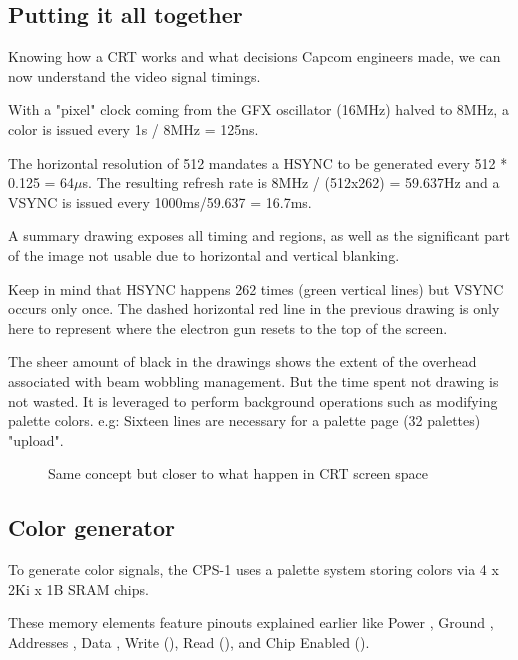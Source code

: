 \subsection{Putting it all together}

Knowing how a CRT works and what decisions Capcom engineers made, we can now understand the video signal timings.

With a "pixel" clock coming from the GFX oscillator (16MHz) halved to 8MHz, a color is issued every 1s / 8MHz = 125ns.

The horizontal resolution of 512 mandates a HSYNC to be generated every 512 * 0.125 = 64$\mu$s. The resulting refresh rate is 8MHz / (512x262) = 59.637Hz and a VSYNC is issued every 1000ms/59.637 = 16.7ms.


A summary drawing exposes all timing and regions, as well as the significant part of the image not usable due to horizontal and vertical blanking.






Keep in mind that HSYNC happens 262 times (green vertical lines) but VSYNC occurs only once. The dashed horizontal red line in the previous drawing is only here to represent where the electron gun resets to the top of the screen.

The sheer amount of black in the drawings shows the extent of the overhead associated with beam wobbling management. But the time spent not drawing is not wasted. It is leveraged to perform background operations such as modifying palette colors. e.g: Sixteen lines are necessary for a palette page (32 palettes) "upload".

\begin{figure}[H]
\caption*{Same concept but closer to what happen in CRT screen space}
\end{figure}


\subsection{Color generator}

To generate color signals, the CPS-1 uses a palette system storing colors via 4 x 2Ki x 1B  SRAM chips.


These memory elements feature pinouts explained earlier like Power , Ground , Addresses , Data , Write (), Read (), and Chip Enabled ().

